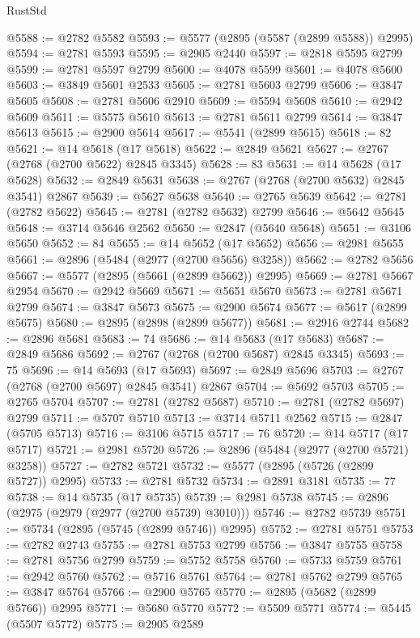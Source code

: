 \begin{lexlean}{RustStd}
\begin{coremodule}
@5588 := @2782 @5582
@5593 := @5577 (@2895 (@5587 (@2899 @5588)) @2995)
@5594 := @2781 @5593
@5595 := @2905 @2440
@5597 := @2818 @5595 @2799
@5599 := @2781 @5597 @2799
@5600 := @4078 @5599
@5601 := @4078 @5600
@5603 := @3849 @5601 @2533
@5605 := @2781 @5603 @2799
@5606 := @3847 @5605
@5608 := @2781 @5606 @2910
@5609 := @5594 @5608
@5610 := @2942 @5609
@5611 := @5575 @5610
@5613 := @2781 @5611 @2799
@5614 := @3847 @5613
@5615 := @2900 @5614
@5617 := @5541 (@2899 @5615)
@5618 := 82
@5621 := @14 @5618 (@17 @5618)
@5622 := @2849 @5621
@5627 := @2767 (@2768 (@2700 @5622) @2845 @3345)
@5628 := 83
@5631 := @14 @5628 (@17 @5628)
@5632 := @2849 @5631
@5638 := @2767 (@2768 (@2700 @5632) @2845 @3541) @2867
@5639 := @5627 @5638
@5640 := @2765 @5639
@5642 := @2781 (@2782 @5622)
@5645 := @2781 (@2782 @5632) @2799
@5646 := @5642 @5645
@5648 := @3714 @5646 @2562
@5650 := @2847 (@5640 @5648)
@5651 := @3106 @5650
@5652 := 84
@5655 := @14 @5652 (@17 @5652)
@5656 := @2981 @5655
@5661 := @2896 (@5484 (@2977 (@2700 @5656) @3258))
@5662 := @2782 @5656
@5667 := @5577 (@2895 (@5661 (@2899 @5662)) @2995)
@5669 := @2781 @5667 @2954
@5670 := @2942 @5669
@5671 := @5651 @5670
@5673 := @2781 @5671 @2799
@5674 := @3847 @5673
@5675 := @2900 @5674
@5677 := @5617 (@2899 @5675)
@5680 := @2895 (@2898 (@2899 @5677))
@5681 := @2916 @2744
@5682 := @2896 @5681
@5683 := 74
@5686 := @14 @5683 (@17 @5683)
@5687 := @2849 @5686
@5692 := @2767 (@2768 (@2700 @5687) @2845 @3345)
@5693 := 75
@5696 := @14 @5693 (@17 @5693)
@5697 := @2849 @5696
@5703 := @2767 (@2768 (@2700 @5697) @2845 @3541) @2867
@5704 := @5692 @5703
@5705 := @2765 @5704
@5707 := @2781 (@2782 @5687)
@5710 := @2781 (@2782 @5697) @2799
@5711 := @5707 @5710
@5713 := @3714 @5711 @2562
@5715 := @2847 (@5705 @5713)
@5716 := @3106 @5715
@5717 := 76
@5720 := @14 @5717 (@17 @5717)
@5721 := @2981 @5720
@5726 := @2896 (@5484 (@2977 (@2700 @5721) @3258))
@5727 := @2782 @5721
@5732 := @5577 (@2895 (@5726 (@2899 @5727)) @2995)
@5733 := @2781 @5732
@5734 := @2891 @3181
@5735 := 77
@5738 := @14 @5735 (@17 @5735)
@5739 := @2981 @5738
@5745 := @2896 (@2975 (@2979 (@2977 (@2700 @5739) @3010)))
@5746 := @2782 @5739
@5751 := @5734 (@2895 (@5745 (@2899 @5746)) @2995)
@5752 := @2781 @5751
@5753 := @2782 @2743
@5755 := @2781 @5753 @2799
@5756 := @3847 @5755
@5758 := @2781 @5756 @2799
@5759 := @5752 @5758
@5760 := @5733 @5759
@5761 := @2942 @5760
@5762 := @5716 @5761
@5764 := @2781 @5762 @2799
@5765 := @3847 @5764
@5766 := @2900 @5765
@5770 := @2895 (@5682 (@2899 @5766)) @2995
@5771 := @5680 @5770
@5772 := @5509 @5771
@5774 := @5445 (@5507 @5772)
@5775 := @2905 @2589

\end{coremodule}
\end{lexlean}
